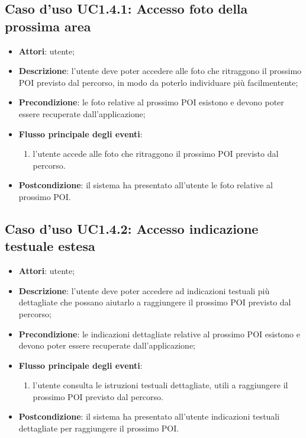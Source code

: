 \documentclass[../AnalisiDeiRequisiti.tex]{subfiles}
\begin{document}
\subsection{Caso d'uso UC1.4.1: Accesso foto della prossima area}
\begin{itemize}
	\item \textbf{Attori}: utente;
	\item \textbf{Descrizione}: l'utente deve poter accedere alle foto che ritraggono il prossimo POI previsto dal percorso, in modo da poterlo individuare più facilmentente; 
	\item \textbf{Precondizione}: le foto relative al prossimo POI esistono e devono poter essere recuperate dall'applicazione;
	
	\item \textbf{Flusso principale degli eventi}:
	\begin{enumerate}
		\item l'utente accede alle foto che ritraggono il prossimo POI previsto dal percorso.
		
	\end{enumerate}
	\item \textbf{Postcondizione}: il sistema ha presentato all'utente le foto relative al prossimo POI.
\end{itemize}
\hypertarget{UC1.4.2}{}
\subsection{Caso d'uso UC1.4.2: Accesso indicazione testuale estesa}
\begin{itemize}
	\item \textbf{Attori}: utente;
	\item \textbf{Descrizione}: l'utente deve poter accedere ad indicazioni testuali più dettagliate che possano aiutarlo a raggiungere il prossimo POI previsto dal percorso; 
	\item \textbf{Precondizione}: le indicazioni dettagliate relative al prossimo POI esistono e devono poter essere recuperate dall'applicazione;
	
	\item \textbf{Flusso principale degli eventi}:
	\begin{enumerate}
		\item l'utente consulta le istruzioni testuali dettagliate, utili a raggiungere il prossimo POI previsto dal percorso.
		
	\end{enumerate}
	\item \textbf{Postcondizione}: il sistema ha presentato all'utente indicazioni testuali dettagliate per raggiungere il prossimo POI.
\end{itemize}
\hypertarget{UC1.4.3}{}
\end{document}
